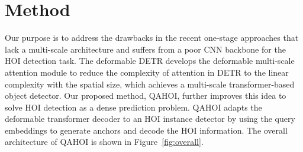 \documentclass[10pt,twocolumn,letterpaper]{article}
\begin{document}
\section{Method}
Our purpose is to address the drawbacks in the recent one-stage approaches that lack a multi-scale architecture and suffers from a poor CNN backbone for the HOI detection task.
The deformable DETR \cite{zhu2020deformable} develops the deformable multi-scale attention module to reduce the complexity of attention in DETR to the linear complexity with the spatial size, which achieves a multi-scale transformer-based object detector.
Our proposed method, QAHOI, further improves this idea to solve HOI detection as a dense prediction problem.
QAHOI adapts the deformable transformer decoder to an HOI instance detector by using the query embeddings to generate anchors and decode the HOI information.
The overall architecture of QAHOI is shown in Figure~\ref{fig:overall}.
\end{document}
